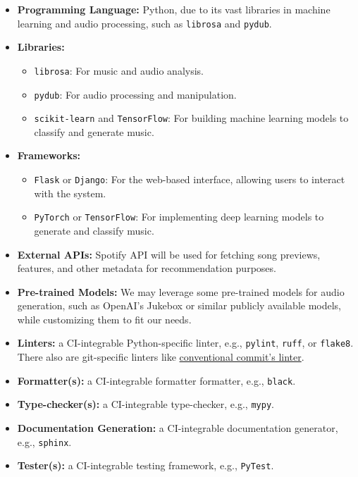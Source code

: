 \documentclass{article}
\begin{document}
\begin{itemize}
    \item \textbf{Programming Language:} Python, due to its vast libraries in machine learning and audio processing, such as \texttt{librosa} and \texttt{pydub}.
    \item \textbf{Libraries:} 
        \begin{itemize}
            \item \texttt{librosa}: For music and audio analysis.
            \item \texttt{pydub}: For audio processing and manipulation.
            \item \texttt{scikit-learn} and \texttt{TensorFlow}: For building machine learning models to classify and generate music.
        \end{itemize}
    \item \textbf{Frameworks:} 
        \begin{itemize}
            \item \texttt{Flask} or \texttt{Django}: For the web-based interface, allowing users to interact with the system.
            \item \texttt{PyTorch} or \texttt{TensorFlow}: For implementing deep learning models to generate and classify music.
        \end{itemize}
    \item \textbf{External APIs:} Spotify API will be used for fetching song previews, features, and other metadata for recommendation purposes.
    \item \textbf{Pre-trained Models:} We may leverage some pre-trained models for audio generation, such as OpenAI's Jukebox or similar publicly available models, while customizing them to fit our needs.
    \item \textbf{Linters:} a CI-integrable Python-specific linter, e.g., \texttt{pylint}, \texttt{ruff}, or \texttt{flake8}. There also are git-specific linters like \href{https://github.com/conventional-changelog/commitlint/tree/master/%40commitlint/config-conventional}{conventional commit's linter}.
    \item \textbf{Formatter(s):} a CI-integrable formatter formatter, e.g., \texttt{black}.
    \item \textbf{Type-checker(s):} a CI-integrable type-checker, e.g., \texttt{mypy}.
    \item \textbf{Documentation Generation:} a CI-integrable documentation generator, e.g., \texttt{sphinx}.
    \item \textbf{Tester(s):} a CI-integrable testing framework, e.g., \texttt{PyTest}.

\end{itemize}
\end{document}
